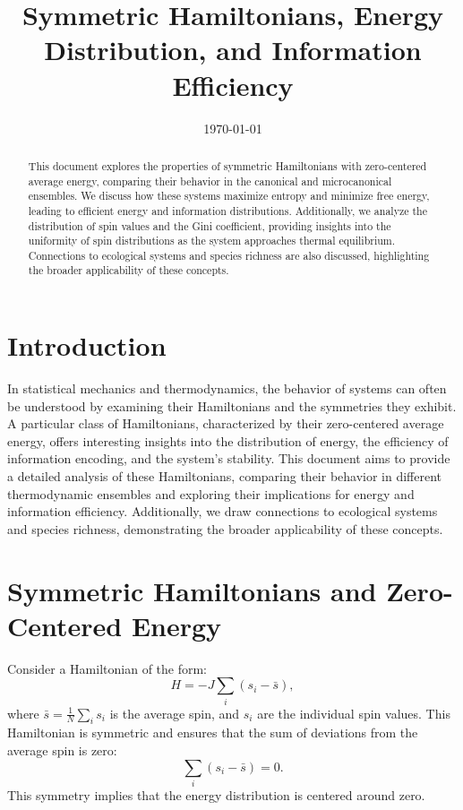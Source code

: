 \documentclass{article}
\title{Symmetric Hamiltonians, Energy Distribution, and Information Efficiency}
\author{}
\date{\today}
\begin{document}
\maketitle
\linenumbers

\begin{abstract}
This document explores the properties of symmetric Hamiltonians with zero-centered average energy, comparing their behavior in the canonical and microcanonical ensembles. We discuss how these systems maximize entropy and minimize free energy, leading to efficient energy and information distributions. Additionally, we analyze the distribution of spin values and the Gini coefficient, providing insights into the uniformity of spin distributions as the system approaches thermal equilibrium. Connections to ecological systems and species richness are also discussed, highlighting the broader applicability of these concepts.
\end{abstract}

\section{Introduction}
In statistical mechanics and thermodynamics, the behavior of systems can often be understood by examining their Hamiltonians and the symmetries they exhibit. A particular class of Hamiltonians, characterized by their zero-centered average energy, offers interesting insights into the distribution of energy, the efficiency of information encoding, and the system's stability. This document aims to provide a detailed analysis of these Hamiltonians, comparing their behavior in different thermodynamic ensembles and exploring their implications for energy and information efficiency. Additionally, we draw connections to ecological systems and species richness, demonstrating the broader applicability of these concepts.

\section{Symmetric Hamiltonians and Zero-Centered Energy}
Consider a Hamiltonian of the form:
\begin{equation}
H = -J \sum_i (s_i - \bar{s}),
\end{equation}
where \( \bar{s} = \frac{1}{N} \sum_i s_i \) is the average spin, and \( s_i \) are the individual spin values. This Hamiltonian is symmetric and ensures that the sum of deviations from the average spin is zero:
\begin{equation}
\sum_i (s_i - \bar{s}) = 0.
\end{equation}
This symmetry implies that the energy distribution is centered around zero.
\end{document}
